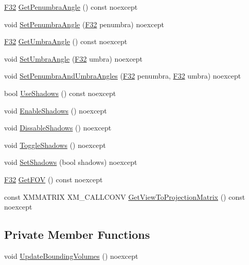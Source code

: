 \begin{DoxyCompactItemize}
\item 
\hyperlink{namespacemage_aa97e833b45f06d60a0a9c4fc22ae02c0}{F32} \hyperlink{classmage_1_1_spot_light_a37d61501193f5ed4ecefe4015595ed89}{Get\+Penumbra\+Angle} () const noexcept
\item 
void \hyperlink{classmage_1_1_spot_light_a7de9894d815f8ac69cbfefc8656e8f8f}{Set\+Penumbra\+Angle} (\hyperlink{namespacemage_aa97e833b45f06d60a0a9c4fc22ae02c0}{F32} penumbra) noexcept
\item 
\hyperlink{namespacemage_aa97e833b45f06d60a0a9c4fc22ae02c0}{F32} \hyperlink{classmage_1_1_spot_light_ae29059615f77f1afe414dc826b2d2af8}{Get\+Umbra\+Angle} () const noexcept
\item 
void \hyperlink{classmage_1_1_spot_light_aab2685ef31177d7e40ef964fb9bc0e24}{Set\+Umbra\+Angle} (\hyperlink{namespacemage_aa97e833b45f06d60a0a9c4fc22ae02c0}{F32} umbra) noexcept
\item 
void \hyperlink{classmage_1_1_spot_light_a7510d29df641a651bab5f3d393e18b60}{Set\+Penumbra\+And\+Umbra\+Angles} (\hyperlink{namespacemage_aa97e833b45f06d60a0a9c4fc22ae02c0}{F32} penumbra, \hyperlink{namespacemage_aa97e833b45f06d60a0a9c4fc22ae02c0}{F32} umbra) noexcept
\item 
bool \hyperlink{classmage_1_1_spot_light_af41a8c0d83b45d048a2d1a030c1235f8}{Use\+Shadows} () const noexcept
\item 
void \hyperlink{classmage_1_1_spot_light_a51694c316560929e6ae49c019d3dc763}{Enable\+Shadows} () noexcept
\item 
void \hyperlink{classmage_1_1_spot_light_ae43668c2ae4c041b8abf822e15ab2185}{Dissable\+Shadows} () noexcept
\item 
void \hyperlink{classmage_1_1_spot_light_ae81d5d3c485a85f373d5b7b861919a3c}{Toggle\+Shadows} () noexcept
\item 
void \hyperlink{classmage_1_1_spot_light_a290ce2f0ce8814cac75f05322fc01cd5}{Set\+Shadows} (bool shadows) noexcept
\item 
\hyperlink{namespacemage_aa97e833b45f06d60a0a9c4fc22ae02c0}{F32} \hyperlink{classmage_1_1_spot_light_a6cbc0ac77c28796cc25a7131bfe4a1c1}{Get\+F\+OV} () const noexcept
\item 
const X\+M\+M\+A\+T\+R\+IX X\+M\+\_\+\+C\+A\+L\+L\+C\+O\+NV \hyperlink{classmage_1_1_spot_light_ae436e8fee37639e9218cc7f3822cebbd}{Get\+View\+To\+Projection\+Matrix} () const noexcept
\end{DoxyCompactItemize}
\subsection*{Private Member Functions}
\begin{DoxyCompactItemize}
\item 
void \hyperlink{classmage_1_1_spot_light_a83035abee0050acdca47b1f95b30a793}{Update\+Bounding\+Volumes} () noexcept
\end{DoxyCompactItemize}
